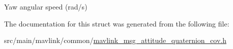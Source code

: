 Yaw angular speed (rad/s) 



The documentation for this struct was generated from the following file\+:\begin{DoxyCompactItemize}
\item 
src/main/mavlink/common/\hyperlink{mavlink__msg__attitude__quaternion__cov_8h}{mavlink\+\_\+msg\+\_\+attitude\+\_\+quaternion\+\_\+cov.\+h}\end{DoxyCompactItemize}
